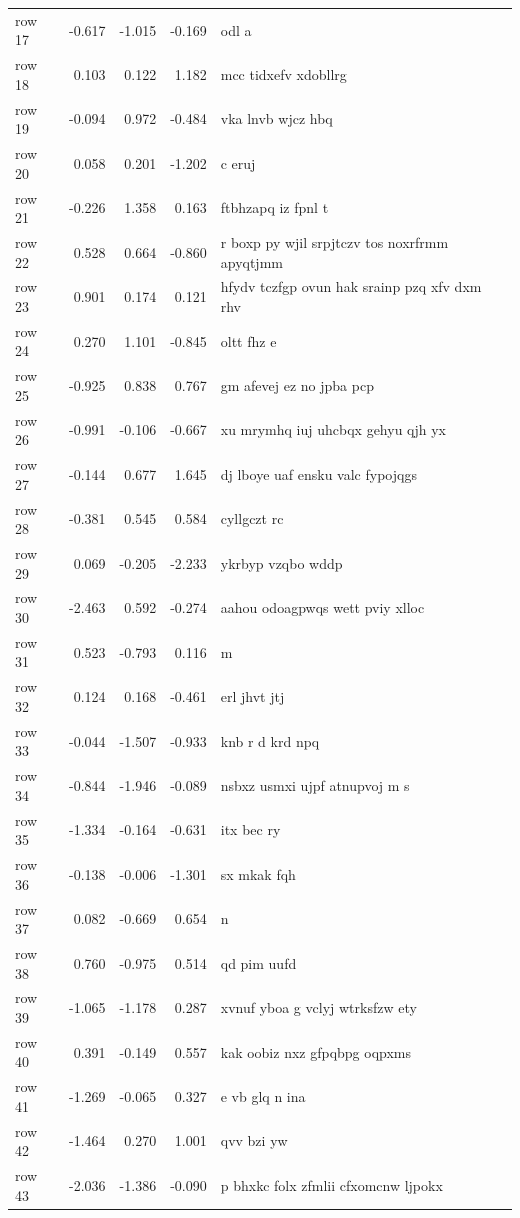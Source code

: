\documentclass[twoside]{extreport}
\begin{document}
\begin{longtable}[]{@{}lrrrl@{}}
row 17 & -0.617 & -1.015 & -0.169 & odl a \\
row 18 & 0.103 & 0.122 & 1.182 & mcc tidxefv xdobllrg \\
row 19 & -0.094 & 0.972 & -0.484 & vka lnvb wjcz hbq \\
row 20 & 0.058 & 0.201 & -1.202 & c eruj \\
row 21 & -0.226 & 1.358 & 0.163 & ftbhzapq iz fpnl t \\
row 22 & 0.528 & 0.664 & -0.860 & r boxp py wjil srpjtczv tos noxrfrmm
apyqtjmm \\
row 23 & 0.901 & 0.174 & 0.121 & hfydv tczfgp ovun hak srainp pzq xfv
dxm rhv \\
row 24 & 0.270 & 1.101 & -0.845 & oltt fhz e \\
row 25 & -0.925 & 0.838 & 0.767 & gm afevej ez no jpba pcp \\
row 26 & -0.991 & -0.106 & -0.667 & xu mrymhq iuj uhcbqx gehyu qjh yx \\
row 27 & -0.144 & 0.677 & 1.645 & dj lboye uaf ensku valc fypojqgs \\
row 28 & -0.381 & 0.545 & 0.584 & cyllgczt rc \\
row 29 & 0.069 & -0.205 & -2.233 & ykrbyp vzqbo wddp \\
row 30 & -2.463 & 0.592 & -0.274 & aahou odoagpwqs wett pviy xlloc \\
row 31 & 0.523 & -0.793 & 0.116 & m \\
row 32 & 0.124 & 0.168 & -0.461 & erl jhvt jtj \\
row 33 & -0.044 & -1.507 & -0.933 & knb r d krd npq \\
row 34 & -0.844 & -1.946 & -0.089 & nsbxz usmxi ujpf atnupvoj m s \\
row 35 & -1.334 & -0.164 & -0.631 & itx bec ry \\
row 36 & -0.138 & -0.006 & -1.301 & sx mkak fqh \\
row 37 & 0.082 & -0.669 & 0.654 & n \\
row 38 & 0.760 & -0.975 & 0.514 & qd pim uufd \\
row 39 & -1.065 & -1.178 & 0.287 & xvnuf yboa g vclyj wtrksfzw ety \\
row 40 & 0.391 & -0.149 & 0.557 & kak oobiz nxz gfpqbpg oqpxms \\
row 41 & -1.269 & -0.065 & 0.327 & e vb glq n ina \\
row 42 & -1.464 & 0.270 & 1.001 & qvv bzi yw \\
row 43 & -2.036 & -1.386 & -0.090 & p bhxkc folx zfmlii cfxomcnw ljpokx

\end{longtable}
\end{document}
